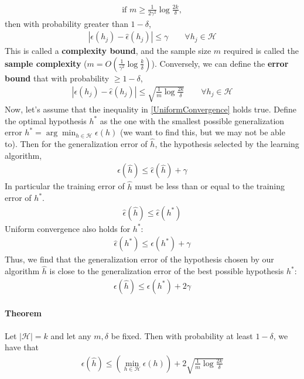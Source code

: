 \documentclass[letterpaper,10pt]{article}
\begin{document}
\begin{align}
\text{if } m \geq \frac{1}{2\gamma^2} \log \frac{2k}{\delta},
\end{align} 
then with probability greater than $1-\delta$, 
\begin{align}
|\epsilon(h_j) - \hat \epsilon(h_j) | \leq \gamma \qquad \forall h_j \in \mathscr{H} \label{UniformConvergence}
\end{align}
This is called a \textbf{complexity bound}, and the sample size $m$ required is called the \textbf{sample complexity} ($m = O\left(\frac{1}{\gamma^2}\log\frac{k}{\delta}\right)$). Conversely, we can define the \textbf{error bound} that with probability $\geq 1-\delta$, 
\begin{align}
|\epsilon(h_j) - \hat \epsilon(h_j) | \leq \sqrt{\frac{1}{m} \log \frac{2k}{\delta}} \qquad \forall h_j \in \mathscr{H}
\end{align}
Now, let's assume that the inequality in \ref{UniformConvergence} holds true. Define the optimal hypothesis $h^*$ as the one with the smallest possible generalization error $h^* = \arg\min_{h\in \mathscr{H}} \epsilon(h)$ (we want to find this, but we may not be able to). Then for the generalization error of $\hat h$, the hypothesis selected by the learning algorithm,
\begin{align}
\epsilon(\hat h) \leq \hat \epsilon(\hat h) + \gamma
\end{align}
In particular the training error of $\hat h$ must be less than or equal to the training error of $h^*$.
\begin{align}
\hat \epsilon(\hat h) \leq \hat \epsilon(h^*)
\end{align}
Uniform convergence also holds for $h^*$:
\begin{align}
\hat \epsilon(h^*) \leq \epsilon(h^*) + \gamma
\end{align}
Thus, we find that the generalization error of the hypothesis chosen by our algorithm $\hat h$ is close to the generalization error of the best possible hypothesis $h^*$:
\begin{align}
\epsilon(\hat h) \leq \epsilon(h^*)  + 2\gamma
\end{align}

\paragraph{Theorem} Let $|\mathscr{H}| = k$ and let any $m, \delta$ be fixed. Then with probability at least $1-\delta$, we have that
\begin{align}
\epsilon(\hat h) \leq \left( \min_{h \in \mathscr{H}} \epsilon(h) \right)  + 2\sqrt{\frac{1}{m} \log \frac{2k}{\delta}}
\end{align}
\end{document}
